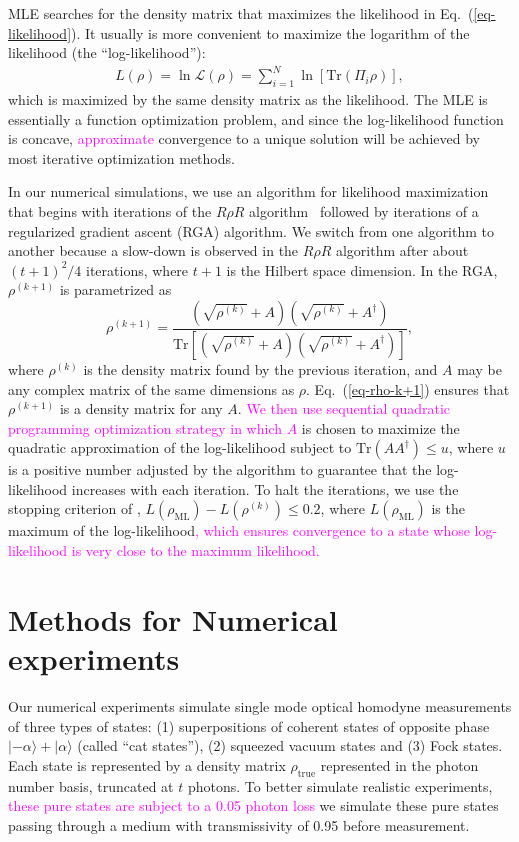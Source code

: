 \documentclass[
reprint,
superscriptaddress,
showpacs,
amsmath,
amssymb,
aps,
pra,
longbibliography
]{revtex4-1}
\providecommand{\editcolor}[2]{\textcolor{#1}{#2}}
\providecommand{\editcolor}[2]{#2}
\newcommand{\SG}[1]{\editcolor{magenta}{#1}}
\begin{document}
MLE searches for the density matrix that maximizes the likelihood
in Eq.~(\ref{eq-likelihood}). It usually is
more convenient to maximize the logarithm of the likelihood (the
``log-likelihood''):
\begin{eqnarray}
  L (\rho) = \ln \mathcal{L} (\rho)= \sum_{i=1}^{N} \ln [\mathrm{Tr} (\Pi_i \rho)],
\end{eqnarray} 
which is maximized by the same density matrix as the likelihood. The
MLE is essentially a function optimization problem, and since the
log-likelihood function is concave, \SG{approximate} convergence to a
unique solution will be achieved by most iterative optimization
methods.

In our numerical simulations, we use an algorithm for likelihood
maximization that begins with iterations of the $R\rho R$
algorithm~\cite{Rehacek2007} followed by iterations of a regularized
gradient ascent (RGA) algorithm. We switch from one algorithm to another 
because a slow-down is observed in the $R\rho R$ algorithm
after about $(t+1)^2/4$ iterations, where $t+1$ is the Hilbert
  space dimension. In the RGA, $\rho^{(k+1)}$ is parametrized as
\begin{equation}
  \rho^{(k+1)}=\frac{\left(\sqrt{\rho^{(k)}}+A\right)\left(\sqrt{\rho^{(k)}}+A^{\dagger}\right)}{\mathrm{Tr}\left[\left(\sqrt{\rho^{(k)}}+A\right)\left(\sqrt{\rho^{(k)}}+A^{\dagger}\right)\right]},
  \label{eq-rho-k+1}
\end{equation}
where $\rho^{(k)}$ is the density matrix found by the previous
iteration, and $A$ may be any complex matrix of the same dimensions as
$\rho$. Eq.~(\ref{eq-rho-k+1}) ensures that $\rho^{(k+1)}$ is a
density matrix for any $A$. \SG{We then use sequential quadratic
  programming optimization strategy \cite{Nocedal2006} in which $A$}
is chosen to maximize the quadratic approximation of the
log-likelihood subject to $\text{Tr}(AA^{\dagger})\leq u$, where $u$
is a positive number adjusted by the algorithm to guarantee that the
log-likelihood increases with each iteration. To halt the iterations,
we use the stopping criterion of \cite{Glancy2012},
$L(\rho_{\text{ML}})-L(\rho^{(k)})\leq 0.2$, where
$L(\rho_{\text{ML}})$ is the maximum of the log-likelihood\SG{, which
  ensures convergence to a state whose log-likelihood is very close to
  the maximum likelihood.}



\section{Methods for Numerical experiments}
\label{numerical-experiments}
Our numerical experiments simulate single mode optical homodyne
measurements of three types of states: (1) superpositions of coherent
states of opposite phase $|-\alpha\rangle + |\alpha\rangle$ (called
``cat states''), (2) squeezed vacuum states and (3) Fock states.  Each
state is represented by a density matrix $\rho_{\mathrm{true}}$
represented in the photon number basis, truncated at $t$ photons. To
better simulate realistic experiments, \SG{these pure states are
  subject to a 0.05 photon loss} we simulate these pure states passing
through a medium with transmissivity of 0.95 before measurement.
\end{document}
